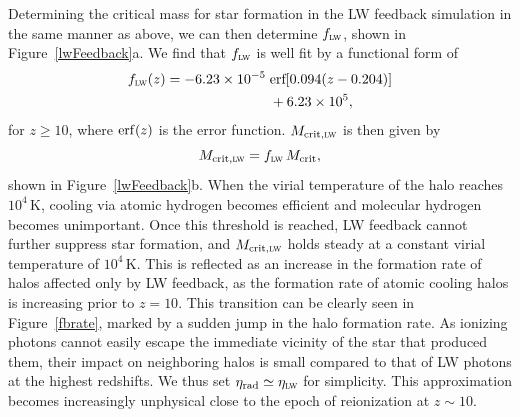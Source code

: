 \documentclass{thesis}
\newcommand{\RefFig}[1]{\mbox{Figure~\ref{#1}}}
\begin{document}
Determining the critical mass for star formation in the LW feedback
simulation in the same manner as above, we can then determine
$f_{\textsc{lw}}$, shown in \RefFig{lwFeedback}a.  We find that
$f_{\textsc{lw}}$ is well fit by a functional form of
\begin{equation}
  \label{flweq}
  \begin{split}
 f_{\textsc{lw}}(z) = -6.23\times10^{-5} \;
 &\textrm{erf}[0.094 (z - 0.204)] \\
 &+ 6. 23\times10^{5},
 \end{split}
\end{equation}
for $z\geq10$, where ${\rm erf}(z)$ is the error function.
$M_{\rm crit, \textsc{lw}}$ is then given by
\begin{equation}
  \label{mcritlweq}
M_{\rm crit, \textsc{lw}} = f_{\textsc{lw}} \,M_{\rm crit},
\end{equation}
shown in \RefFig{lwFeedback}b.  When the virial temperature of the
halo reaches $10^4\,$K, cooling via atomic hydrogen becomes efficient
and molecular hydrogen becomes unimportant.  Once this threshold is
reached, LW feedback cannot further suppress star formation, and
$M_{\rm crit, \textsc{lw}}$ holds steady at a constant virial
temperature of $10^4\,$K.  This is reflected as an increase in the
formation rate of halos affected only by LW feedback, as the formation
rate of atomic cooling halos is increasing prior to $z=10$.  This
transition can be clearly seen in \RefFig{fbrate}, marked by a sudden
jump in the halo formation rate.  As ionizing photons cannot easily
escape the immediate vicinity of the star that produced them, their
impact on neighboring halos is small compared to that of LW photons at
the highest redshifts.  We thus set $\eta_{\rm rad} \simeq
\eta_{\textsc{lw}}$ for simplicity.  This approximation becomes
increasingly unphysical close to the epoch of reionization at
$z\sim10$.
\end{document}
